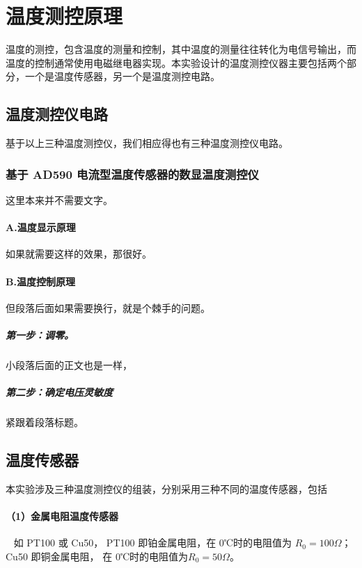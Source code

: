\documentclass[10pt,a4paper,twocolumn,twoside,UTF8]{ctexart}
\begin{document}
\newpage
\section{温度测控原理}
温度的测控，包含温度的测量和控制，其中温度的测量往往转化为电信号输出，而温度的控制通常使用电磁继电器实现。本实验设计的温度测控仪器主要包括两个部分，一个是温度传感器，另一个是温度测控电路。

	\subsection{温度测控仪电路}
	基于以上三种温度测控仪，我们相应得也有三种温度测控仪电路。
	\subsubsection{基于 AD590 电流型温度传感器的数显温度测控仪}
	这里本来并不需要文字。
	\paragraph{A.温度显示原理}
	如果就需要这样的效果，那很好。
	\paragraph{B.温度控制原理}但段落后面如果需要换行，就是个棘手的问题。
	\subparagraph{第一步：调零。}小段落后面的正文也是一样，
	\subparagraph{第二步：确定电压灵敏度}
	紧跟着段落标题。


	\subsection{温度传感器}
	本实验涉及三种温度测控仪的组装，分别采用三种不同的温度传感器，包括
	\paragraph{（1）金属电阻温度传感器}~
	\newline %
	\indent 如 PT100 或 Cu50， PT100 即铂金属电阻，在 0℃时的电阻值为 $R_0=100\Omega$； Cu50 即铜金属电阻， 在 0℃时的电阻值为$R_0=50\Omega$。
\end{document}
